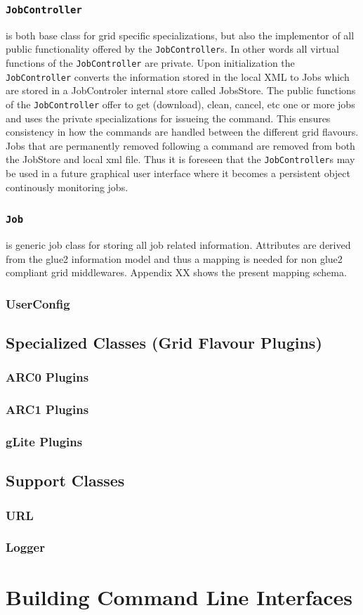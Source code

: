 \documentclass{book}
\newcommand{\JobController}{\texttt{JobController}}
\newcommand{\Job}{\texttt{Job}}
\begin{document}
\subsection{{\JobController}} is both base class for grid specific specializations, but also the implementor of all public functionality 
offered by the {\JobController}s. In other words all virtual functions of the {\JobController} are private. Upon initialization the 
{\JobController} converts the information stored in the local XML to Jobs which are stored in a JobControler internal store called JobsStore. 
The public functions of the {\JobController} offer to get (download), clean, cancel, etc one or more jobs and uses the private specializations 
for issueing the command. This ensures consistency in how the commands are handled between the different grid flavours. Jobs that are 
permanently removed following a command are removed from both the JobStore and local xml file. Thus it is foreseen that the {\JobController}s 
may be used in a future graphical user interface where it becomes a persistent object continously monitoring jobs.

\subsection{{\Job}} is generic job class for storing all job related information. Attributes are derived from the glue2 information model 
and thus a mapping is needed for non glue2 compliant grid middlewares. Appendix XX shows the present mapping schema.

\subsection{UserConfig}

\section{Specialized Classes (Grid Flavour Plugins)}
\label{sec:plugins}
\subsection{ARC0 Plugins}
\subsection{ARC1 Plugins}
\subsection{gLite Plugins}

\section{Support Classes}
\subsection{URL}
\subsection{Logger}

\chapter{Building Command Line Interfaces}
\label{sec:cli}


\end{document}
